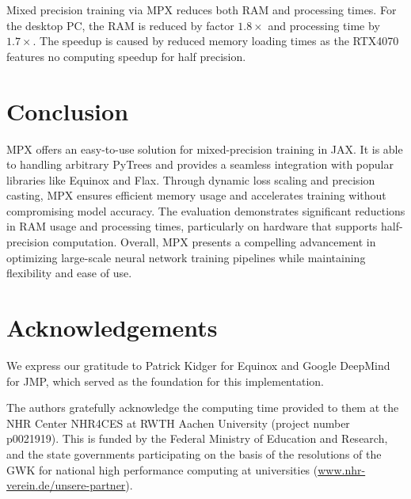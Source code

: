 \documentclass[10pt, a4paper, logo, onecolumn, internal, copyright]{dsme}
\newcommand{\mpx}{\textsc{MPX}}
\begin{document}
Mixed precision training via \mpx{} reduces both RAM and processing times.
For the desktop PC, the RAM is reduced by factor $1.8\times$ and processing time by $1.7\times$.
The speedup is caused by reduced memory loading times as the RTX4070 features no computing speedup for half precision.

\section{Conclusion}

\mpx{} offers an easy-to-use solution for mixed-precision training in JAX.
It is able to handling arbitrary PyTrees and provides a seamless integration with popular libraries like Equinox and Flax. 
Through dynamic loss scaling and precision casting, MPX ensures efficient memory usage and accelerates training without compromising model accuracy. 
The evaluation demonstrates significant reductions in RAM usage and processing times, particularly on hardware that supports half-precision computation. 
Overall, MPX presents a compelling advancement in optimizing large-scale neural network training pipelines while maintaining flexibility and ease of use.


\section{Acknowledgements}
We express our gratitude to Patrick Kidger for Equinox and Google DeepMind for JMP, which served as the foundation for this implementation.

The authors gratefully acknowledge the computing time provided to them at the NHR Center NHR4CES at RWTH Aachen University (project number p0021919). This is funded by the Federal Ministry of Education and Research, and the state governments participating on the basis of the resolutions of the GWK for national high performance computing at universities (\url{www.nhr-verein.de/unsere-partner}).






\end{document}
